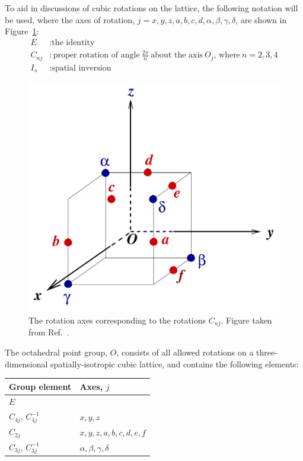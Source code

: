     To aid in discussions of cubic rotations on the lattice, the following notation will be used, where the axes of rotation, $j = x,y,z,a,b,c,d,\alpha,\beta,\gamma,\delta$, are shown in Figure~\ref{fig:rotation_axes}:
    \begin{equation}
        \begin{aligned}
            E &: \text{the identity}\\
            C_{nj} &: \text{proper rotation of angle}\ \frac{2\pi}{n}\ \text{about the axis}\ O_j\text{, where}\ n = 2,3,4 \\
            I_s &: \text{spatial inversion}
        \end{aligned}
    \end{equation}
    \begin{figure}
        \centering
        \includegraphics[scale=0.5]{figures/Oaxes.pdf}
        \caption{The rotation axes corresponding to the rotations $C_{nj}$. Figure taken from Ref.~\cite{spectroscopy}.}
        \label{fig:rotation_axes}
    \end{figure}
    The octahedral point group, $O$, consists of all allowed rotations on a three-dimensional spatially-isotropic cubic lattice, and contains the following elements:
    \begin{table}[h!]
        \centering
        \begin{tabular}{l|l}
            Group element & Axes, $j$\\
            \hline
            $E$ & \\
            $C_{4j}$, $C_{4j}^{-1}$ & $x,y,z$ \\
            $C_{2j}$ & $x,y,z,a,b,c,d,e,f$ \\
            $C_{3j}$, $C_{3j}^{-1}$ & $\alpha,\beta,\gamma,\delta$
        \end{tabular}
        \label{table:O}
    \end{table}

